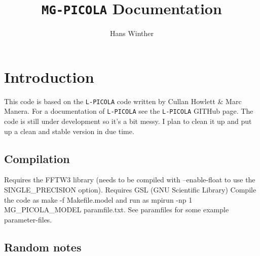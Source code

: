 \documentclass[usenatbib]{article}
\title{\texttt{MG-PICOLA} Documentation}
\author{Hans Winther}
\begin{document}
\maketitle

\section*{Introduction}

This code is based on the \texttt{L-PICOLA} code written by Cullan Howlett \& Marc Manera. For a documentation of \texttt{L-PICOLA} see the \texttt{L-PICOLA} GITHub page. The code is still under development so it's a bit messy. I plan to clean it up and put up a clean and stable version in due time.

\subsection*{Compilation}
Requires the FFTW3 library (needs to be compiled with --enable-float to use the SINGLE\_PRECISION option).
\newline
\newline
Requires GSL (GNU Scientific Library)
\newline
\newline
Compile the code as make -f Makefile.model and run as mpirun -np 1 MG\_PICOLA\_MODEL paramfile.txt. See paramfiles for some example parameter-files.

\subsection*{Random notes}
\end{document}
